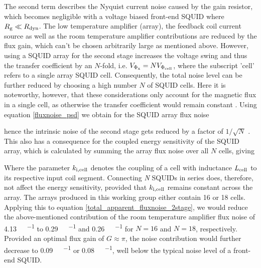 The second term describes the Nyquist current noise caused by the gain resistor, which becomes negligible with a voltage biased front-end SQUID where $R_{\rm g}\ll R_{\rm dyn}$. The low temperature amplifier (array), the feedback coil current source as well as the room temperature amplifier contributions are reduced by the flux gain, which can't be chosen arbitrarily large as mentioned above. However, using a SQUID array for the second stage increases the voltage swing and thus the transfer coefficient by an $N$-fold, i.e. $V_{\rm \Phi_x} = NV_{\rm \Phi_{cell}}$, where the subscript 'cell' refers to a single array SQUID cell. Consequently, the total noise level can be further reduced by choosing a high number $N$ of SQUID cells. Here it is noteworthy, however, that these considerations only account for the magnetic flux in a single cell, as otherwise the transfer coefficient would remain constant \cite{Stawiasz1993,Foglietti1993}. Using equation \ref{fluxnoise_psd} we obtain for the SQUID array flux noise


hence the intrinsic noise of the second stage gets reduced by a factor of $1/\sqrt{N}$ \cite{Stawiasz1993}. This also has a consequence for the coupled energy sensitivity of the SQUID array, which is calculated by summing the array flux noise over all $N$ cells, giving




Where the parameter $k_{\rm i,cell}$ denotes the coupling of a cell with inductance $L_{\rm cell}$ to its respective input coil segment. Connecting \textit{N} SQUIDs in series does, therefore, not affect the energy sensitivity, provided that $k_{\rm i,cell}$ remains constant across the array. The arrays produced in this working group either contain 16 \cite{Kempf2015} or 18 \cite{Kraemer2023} cells. Applying this to equation \ref{total_apparent_fluxnoise_2stage}, we would reduce the above-mentioned contribution of the room temperature amplifier flux noise of \qty{4.13}{\micro\fq\per\sqrthz} to \qty{0.29}{\micro\fq\per\sqrthz} and \qty{0.26}{\micro\fq\per\sqrthz} for $N=16$ and $N=18$, respectively. Provided an optimal flux gain of $G\approx\pi$, the noise contribution would further decrease to \qty{0.09}{\micro\fq\per\sqrthz} or \qty{0.08}{\micro\fq\per\sqrthz}, well below the typical noise level of a front-end SQUID. 

